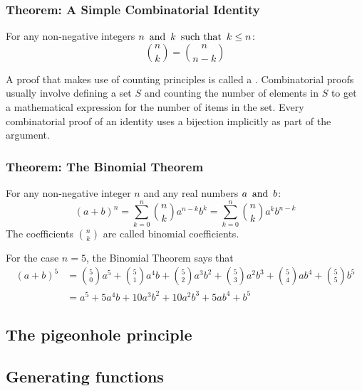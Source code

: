 \subsubsection*{Theorem: A Simple Combinatorial Identity}
For any non-negative integers $n \operatorname{~\text{and}~} k \operatorname{~\text{such that}~} k \leq n$:
\[
  \binom{n}{k} = \binom{n}{n-k}
\]

A proof that makes use of counting principles is called a . Combinatorial proofs usually involve defining a set $S$ and counting the number of elements in $S$ to get a mathematical expression for the number of items in the set. Every combinatorial proof of an identity uses a bijection implicitly as part of the argument.

\subsubsection*{Theorem: The Binomial Theorem}
For any non-negative integer $n$ and any real numbers $a \operatorname{~\text{and}~} b$:
\[
  (a + b)^n = \sum_{k=0}^{n} \binom{n}{k} a^{n-k}b^k = \sum_{k=0}^{n} \binom{n}{k} a^kb^{n-k}
\]
The coefficients $\binom{n}{k}$ are called binomial coefficients.

For the case $n = 5$, the Binomial Theorem says that
\begin{align*}
  (a+b)^5 & = \binom{5}{0}a^5 + \binom{5}{1}a^4b + \binom{5}{2}a^3b^2 + \binom{5}{3}a^2b^3 + \binom{5}{4}ab^4 + \binom{5}{5}b^5 \\
          & = a^5 + 5a^4b + 10a^3b^2 + 10a^2b^3 + 5ab^4 + b^5
\end{align*}

\subsection{The pigeonhole principle}


\subsection{Generating functions}
